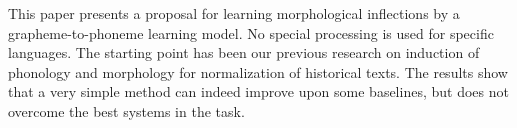 This paper presents a proposal for learning morphological inflections by a grapheme-to-phoneme learning model. No special processing is used for specific languages. The starting point has been our previous research on induction of phonology and morphology for normalization of historical texts. The results show that a very simple method can indeed improve upon some baselines, but does not overcome the best systems in the task.
